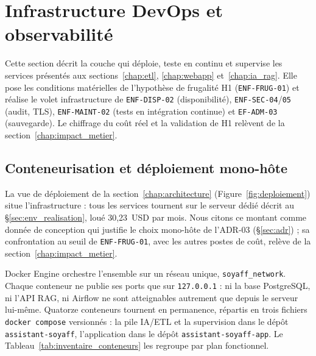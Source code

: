 \section{Infrastructure DevOps et observabilité}
\label{chap:devops}

Cette section décrit la couche qui déploie, teste en continu et supervise les services présentés aux sections~\ref{chap:etl}, \ref{chap:webapp} et~\ref{chap:ia_rag}. Elle pose les conditions matérielles de l'hypothèse de frugalité H1 (\texttt{ENF-FRUG-01}) et réalise le volet infrastructure de \texttt{ENF-DISP-02} (disponibilité), \texttt{ENF-SEC-04}/\texttt{05} (audit, TLS), \texttt{ENF-MAINT-02} (tests en intégration continue) et \texttt{EF-ADM-03} (sauvegarde). Le chiffrage du coût réel et la validation de H1 relèvent de la section~\ref{chap:impact_metier}.

\subsection{Conteneurisation et déploiement mono-hôte}
\label{sec:devops_conteneurisation}

La vue de déploiement de la section~\ref{chap:architecture} (Figure~\ref{fig:deploiement}) situe l'infrastructure : tous les services tournent sur le serveur dédié décrit au §\ref{sec:env_realisation}, loué 30,23~USD par mois. Nous citons ce montant comme donnée de conception qui justifie le choix mono-hôte de l'ADR-03 (\S\ref{sec:adr}) ; sa confrontation au seuil de \texttt{ENF-FRUG-01}, avec les autres postes de coût, relève de la section~\ref{chap:impact_metier}.

Docker Engine orchestre l'ensemble sur un réseau unique, \texttt{soyaff\_network}. Chaque conteneur ne publie ses ports que sur \texttt{127.0.0.1} : ni la base PostgreSQL, ni l'API RAG, ni Airflow ne sont atteignables autrement que depuis le serveur lui-même. Quatorze conteneurs tournent en permanence, répartis en trois fichiers \texttt{docker compose} versionnés : la pile IA/ETL et la supervision dans le dépôt \texttt{assistant-soyaff}, l'application dans le dépôt \texttt{assistant-soyaff-app}. Le Tableau~\ref{tab:inventaire_conteneurs} les regroupe par plan fonctionnel.

